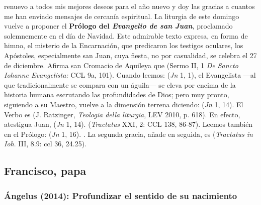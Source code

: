 \begin{body}
	 renuevo a todos mis mejores deseos para el año nuevo y doy las gracias a cuantos me han enviado mensajes de cercanía espiritual. La liturgia de este domingo vuelve a proponer el \textbf{Prólogo del \emph{Evangelio de san Juan}}, proclamado solemnemente en el día de Navidad. Este admirable texto expresa, en forma de himno, el misterio de la Encarnación, que predicaron los testigos oculares, los Apóstoles, especialmente san Juan, cuya fiesta, no por casualidad, se celebra el 27 de diciembre. Afirma san Cromacio de Aquileya que  (Sermo II, 1 \emph{De Sancto Iohanne Evangelista:} CCL 9a, 101). Cuando leemos:  (\emph{Jn} 1, 1), el Evangelista ---al que tradicionalmente se compara con un águila--- se eleva por encima de la historia humana escrutando las profundidades de Dios; pero muy pronto, siguiendo a su Maestro, vuelve a la dimensión terrena diciendo:  (\emph{Jn} 1, 14). El Verbo es  (J. Ratzinger, \emph{Teologia della liturgia}, LEV 2010, p. 618). En efecto, atestigua Juan,  (\emph{Jn} 1, 14).  (\emph{Tractatus} XXI, 2: CCL 138, 86-87). Leemos también en el Prólogo:  (\emph{Jn} 1, 16). . La segunda gracia, añade en seguida, es  (\emph{Tractatus in Ioh}. III, 8.9: ccl 36, 24.25).
\end{body}

\newsection

\subsection{Francisco, papa}

\subsubsection{Ángelus (2014): Profundizar el sentido de su nacimiento}

